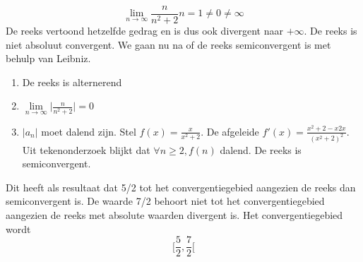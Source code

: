 {$$\lim\limits_{n\to\infty} \frac{n}{n^2 + 2} n = 1 \neq 0 \neq \infty$$
De reeks vertoond hetzelfde gedrag en is dus ook divergent naar $+\infty$. De reeks is niet absoluut convergent. We gaan nu na of de reeks semiconvergent is met behulp van Leibniz.
\begin{enumerate}
	\item De reeks is alternerend
	\item $\lim\limits_{n\to\infty} \big|\frac{n}{n^2 + 2}\big| = 0$
	\item $|a_n|$ moet dalend zijn. Stel $f(x) = \frac{x}{x^2 + 2}$. De afgeleide $f'(x) = \frac{x^2 + 2 - x2x}{(x^2 + 2)^2}$. Uit tekenonderzoek blijkt dat $\forall n \geq 2, f(n) $ dalend. De reeks is semiconvergent.
\end{enumerate}
Dit heeft als resultaat dat 5/2 tot het convergentiegebied aangezien de reeks dan semiconvergent is. De waarde 7/2 behoort niet tot het convergentiegebied aangezien de reeks met absolute waarden divergent is. Het convergentiegebied wordt
$$\bigg[\frac{5}{2}, \frac{7}{2}\bigg[$$
		}

